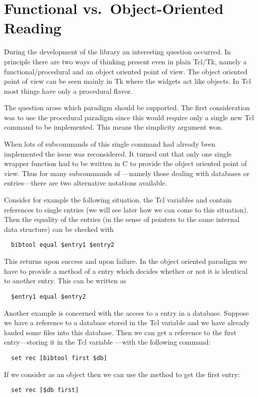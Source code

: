 \section{Functional vs.\ Object-Oriented Reading}

During the development of the \BibTool{} library an interesting
question occurred. In principle there are two ways of thinking present
even in plain Tcl/Tk, namely a functional/pro\-ce\-du\-ral and an
object oriented point of view. The object oriented point of view can
be seen mainly in Tk where the widgets act like objects. In Tcl most
things have only a procedural flavor.

The question arose which paradigm should be supported.  The first
consideration was to use the procedural paradigm since this would
require only a single new Tcl command to be implemented. This means
the simplicity argument won.

When lots of subcommands of this single command  had
already been implemented the issue was reconsidered. It turned out
that only one single wrapper function had to be written in C to
provide the object oriented point of view. Thus for many subcommands
of ---namely those dealing with databases or
entries---there are two alternative notations available.

Consider for example the following situation. the Tcl variables
 and  contain references to single entries (we
will see later how we can come to this situation). Then the equality
of the entries (in the sense of pointers to the same internal data
structure) can be checked with
\begin{verbatim}
  bibtool equal $entry1 $entry2
\end{verbatim}
This returns  upon success and  upon failure. In the
object oriented paradigm we have to provide a method of a entry which
decides whether or not it is identical to another entry. This can be
written as
\begin{verbatim}
  $entry1 equal $entry2
\end{verbatim}

Another example is concerned with the access to a entry in a
database. Suppose we have a reference to a database stored in the Tcl
variable  and we have already loaded some \BibTeX{} files
into this database. Then we can get a reference to the first
entry---storing it in the Tcl variable ---with the
following command:
\begin{verbatim}
  set rec [bibtool first $db]
\end{verbatim}%
If we consider  as an object then we can use the method
 to get the first entry:
\begin{verbatim}
  set rec [$db first]
\end{verbatim}%

